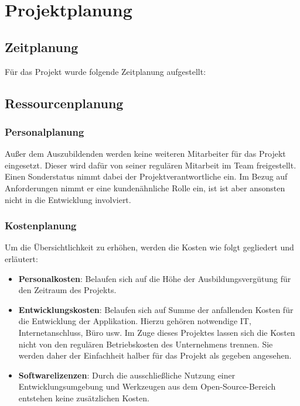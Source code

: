 \section{Projektplanung}
\label{sec:Projektplanung}

\subsection{Zeitplanung}
\label{sec:Zeitplanung}
Für das Projekt wurde folgende Zeitplanung aufgestellt:


\subsection{Ressourcenplanung}
\label{sec:Ressourcenplanung}
\subsubsection{Personalplanung}
\label{sec:Personalplanung}
Außer dem Auszubildenden werden keine weiteren Mitarbeiter für das Projekt eingesetzt. Dieser wird
dafür von seiner regulären Mitarbeit im Team freigestellt. Einen Sonderstatus nimmt dabei der
Projektverantwortliche ein. Im Bezug auf Anforderungen nimmt er eine kundenähnliche Rolle ein, ist
ist aber ansonsten nicht in die Entwicklung involviert.
\subsubsection{Kostenplanung}
\label{sec:Kostenplanung}
Um die Übersichtlichkeit zu erhöhen, werden die Kosten wie folgt gegliedert und erläutert:
\begin{itemize}
	\item \textbf{Personalkosten}: Belaufen sich auf die Höhe der Ausbildungsvergütung für den Zeitraum des Projekts.
	\item \textbf{Entwicklungskosten}: Belaufen sich auf Summe der anfallenden Kosten für die Entwicklung der Applikation.
	Hierzu gehören notwendige IT, Internetanschluss, Büro usw. Im Zuge dieses Projektes lassen sich die Kosten nicht
	von den regulären Betriebskosten des Unternehmens trennen. Sie werden daher der Einfachheit halber für das Projekt als gegeben
	angesehen.
	\item \textbf{Softwarelizenzen}: Durch die ausschließliche Nutzung einer Entwicklungsumgebung und Werkzeugen aus dem
	Open-Source-Bereich entstehen keine zusätzlichen Kosten.
\end{itemize}

